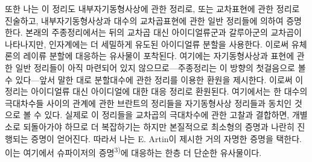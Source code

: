 또한 나는 이 정리도 내부자기동형사상에 관한 정리로, 또는 교차표현에 관한 정리로 진술하고, 내부자기동형사상과 대수의 교차곱표현에 관한 일반 정리들에 의하여 증명한다. 본래의 주종정리에서는 뒤의 교차곱 대신 아이디얼류군과 갈루아군의 교차곱이 나타나지만, 인자계에는 더 세밀하게 유도된 아이디얼류 분할을 사용한다. 이로써 유체론의 레이류 분할에 대응하는 유사물이 포착된다. 여기에는 자기동형사상과 표현에 관한 일반 정리들이 아직 마련되어 있지 않으므로---주종정리는 이 방향의 첫걸음으로 볼 수 있다---앞서 말한 대로 분할대수에 관한 정리를 이용한 환원을 제시한다. 이로써 이 정리는 아이디얼류 대신 아이디얼에 대한 대응 정리로 환원된다. 여기에서는 한 대수의 극대차수들 사이의 관계에 관한 브란트의 정리들을 자기동형사상 정리들과 동치인 것으로 볼 수 있다. 실제로 이 정리들을 교차곱의 극대차수에 관한 고찰과 결합하면, 개별 소로 되돌아가야 하므로 더 복잡하기는 하지만 본질적으로 최소형의 증명과 나란히 진행되는 증명이 얻어진다. 따라서 나는 E. Artin이 제시한 거의 자명한 증명을 택한다. 이는 여기에서 슈파이저의 증명\textsuperscript{3)}에 대응하는 한층 더 단순한 유사물이다.

